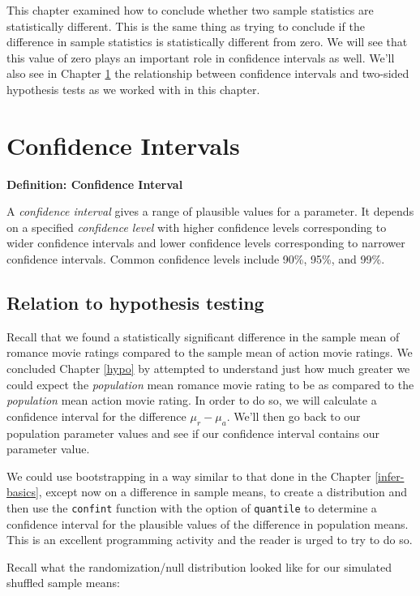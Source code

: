 \documentclass[]{tufte-book}
\begin{document}
This chapter examined how to conclude whether two sample statistics are
statistically different. This is the same thing as trying to conclude if
the difference in sample statistics is statistically different from
zero. We will see that this value of zero plays an important role in
confidence intervals as well. We'll also see in Chapter \ref{ci} the
relationship between confidence intervals and two-sided hypothesis tests
as we worked with in this chapter.

\chapter{Confidence Intervals}\label{ci}

\textbf{Definition: Confidence Interval}

A \emph{confidence interval} gives a range of plausible values for a
parameter. It depends on a specified \emph{confidence level} with higher
confidence levels corresponding to wider confidence intervals and lower
confidence levels corresponding to narrower confidence intervals. Common
confidence levels include 90\%, 95\%, and 99\%.

\section{Relation to hypothesis
testing}\label{relation-to-hypothesis-testing}

Recall that we found a statistically significant difference in the
sample mean of romance movie ratings compared to the sample mean of
action movie ratings. We concluded Chapter \ref{hypo} by attempted to
understand just how much greater we could expect the \emph{population}
mean romance movie rating to be as compared to the \emph{population}
mean action movie rating. In order to do so, we will calculate a
confidence interval for the difference \(\mu_r - \mu_a\). We'll then go
back to our population parameter values and see if our confidence
interval contains our parameter value.

We could use bootstrapping in a way similar to that done in the Chapter
\ref{infer-basics}, except now on a difference in sample means, to
create a distribution and then use the \texttt{confint} function with
the option of \texttt{quantile} to determine a confidence interval for
the plausible values of the difference in population means. This is an
excellent programming activity and the reader is urged to try to do so.

Recall what the randomization/null distribution looked like for our
simulated shuffled sample means:
\end{document}
